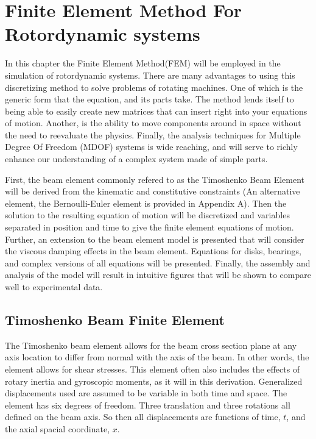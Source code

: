 \chapter{Finite Element Method For Rotordynamic systems}
In this chapter the Finite Element Method(FEM) will be employed in the simulation of rotordynamic systems. There are many advantages to using this discretizing method to solve problems of rotating machines. One of which is the generic form that the equation, and its parts take. The method lends itself to being able to easily create new matrices that can insert right into your equations of motion. Another, is the ability to move components around in space without the need to reevaluate the physics. Finally, the analysis techniques for Multiple Degree Of Freedom (MDOF) systems is wide reaching, and will serve to richly enhance our understanding of a complex system made of simple parts.\par 
First, the beam element commonly refered to as the Timoshenko Beam Element will be derived from the kinematic and constitutive constraints (An alternative element, the Bernoulli-Euler element is provided in Appendix A). Then the solution to the resulting equation of motion will be discretized and variables separated in position and time to give the finite element equations of motion. Further, an extension to the beam element model is presented that will consider the viscous damping effects in the beam element. Equations for disks, bearings, and complex versions of all equations will be presented. Finally, the assembly and analysis of the model will result in intuitive figures that will be shown to compare well to experimental data.
\section{Timoshenko Beam Finite Element} \label{Timoshenko Beam Finite Element}
The Timoshenko beam element allows for the beam cross section plane at any axis location to differ from normal with the axis of the beam. In other words, the element allows for shear stresses. This element often also includes the effects of rotary inertia and gyroscopic moments, as it will in this derivation. Generalized displacements used are assumed to be variable in both time and space. The element has six degrees of freedom. Three translation and three rotations all defined on the beam axis. So then all displacements are functions of time, $ t $, and the axial spacial coordinate, $ x $.
